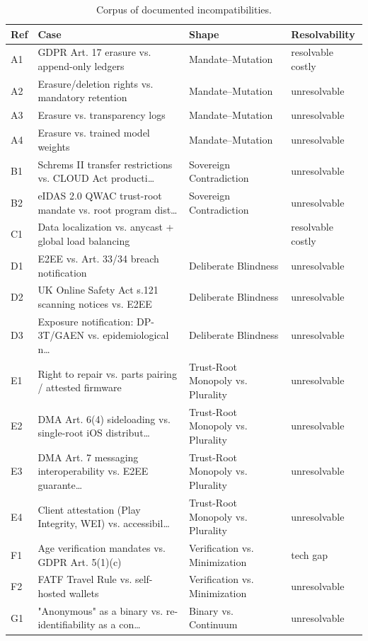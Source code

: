 \begin{table}[t]
\centering
\caption{Corpus of documented incompatibilities.}
\label{tab:corpus}
\footnotesize
\begin{tabular}{llll}
\toprule
Ref & Case & Shape & Resolvability \\
\midrule
  A1 & GDPR Art. 17 erasure vs. append-only ledgers & Mandate--Mutation & resolvable costly \\
  A2 & Erasure/deletion rights vs. mandatory retention & Mandate--Mutation & unresolvable \\
  A3 & Erasure vs. transparency logs & Mandate--Mutation & unresolvable \\
  A4 & Erasure vs. trained model weights & Mandate--Mutation & unresolvable \\
  B1 & Schrems II transfer restrictions vs. CLOUD Act producti… & Sovereign Contradiction & unresolvable \\
  B2 & eIDAS 2.0 QWAC trust-root mandate vs. root program dist… & Sovereign Contradiction & unresolvable \\
  C1 & Data localization vs. anycast + global load balancing &  & resolvable costly \\
  D1 & E2EE vs. Art. 33/34 breach notification & Deliberate Blindness & unresolvable \\
  D2 & UK Online Safety Act s.121 scanning notices vs. E2EE & Deliberate Blindness & unresolvable \\
  D3 & Exposure notification: DP-3T/GAEN vs. epidemiological n… & Deliberate Blindness & unresolvable \\
  E1 & Right to repair vs. parts pairing / attested firmware & Trust-Root Monopoly vs. Plurality & unresolvable \\
  E2 & DMA Art. 6(4) sideloading vs. single-root iOS distribut… & Trust-Root Monopoly vs. Plurality & unresolvable \\
  E3 & DMA Art. 7 messaging interoperability vs. E2EE guarante… & Trust-Root Monopoly vs. Plurality & unresolvable \\
  E4 & Client attestation (Play Integrity, WEI) vs. accessibil… & Trust-Root Monopoly vs. Plurality & unresolvable \\
  F1 & Age verification mandates vs. GDPR Art. 5(1)(c) & Verification vs. Minimization & tech gap \\
  F2 & FATF Travel Rule vs. self-hosted wallets & Verification vs. Minimization & unresolvable \\
  G1 & "Anonymous" as a binary vs. re-identifiability as a con… & Binary vs. Continuum & unresolvable \\

\end{tabular}
\end{table}
